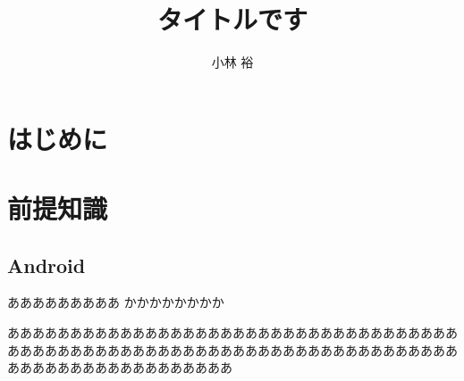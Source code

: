 \documentclass[a4j]{jarticle}
\date{}
\begin{document}
\makeatletter %
	\def\@thesis{平成28年度 東邦大学理学部情報科学科 卒業研究}
	\def\id#1{\def\@id{#1}}
	\def\department#1{\def\@department{#1}}
	
	\def\@maketitle{
		\begin{center}
			\vspace{10mm}
			{\large \@thesis \par}	%
			\vspace{50mm}
			{\huge\bf \@title \par}	%
			\vspace{15mm}
			{\Large 学籍番号　\@id \par}	%
			\vspace{5mm}
			{\Large \@author \par}	%
			\vspace{50mm}
		\end{center}
		\begin{flushright}
			{\large 金岡研究室}
		\end{flushright}
	}
\makeatother

\title{タイトルです} %
\id{5517044} %
\author{小林 裕} %
\maketitle{\title} %
\thispagestyle{empty} %
\newpage %

\tableofcontents %





\newpage
\section{はじめに} 




\newpage
\section{前提知識}
\subsection{Android}

あああああああああ
かかかかかかかか

ああああああああああああああああああああああああああああああああああああああああああああああああああああああああああああああああああああああああああああああああああああああああああ
\end{document}
